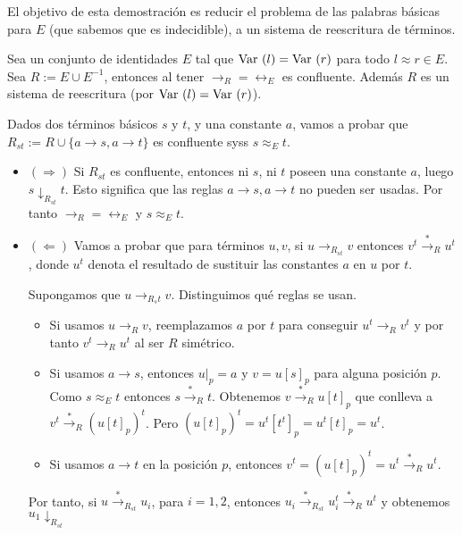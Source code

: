 \begin{demo}
  El objetivo de esta demostración es reducir el problema de las
  palabras básicas para $E$ (que sabemos que es indecidible), a un
  sistema de reescritura de términos.

  Sea un conjunto de identidades $E$ tal que $\mbox{Var }(l) = \mbox{Var }(r)$ para
  todo $l \approx r \in E$. Sea $R := E \cup E^{-1}$, entonces al
  tener $\rightarrow_R = \leftrightarrow_E$ es confluente. Además $R$
  es un sistema de reescritura (por $\mbox{Var }(l) = \mbox{Var }(r)$).

  Dados dos términos básicos $s$ y $t$, y una constante $a$, vamos a
  probar que $R_{st} := R \cup \{ a \rightarrow s, a \rightarrow t \}$
  es confluente syss $s \approx_E t$.

  \begin{itemize}
  \item $(\Rightarrow)$ Si $R_{st}$ es confluente, entonces ni $s$, ni
    $t$ poseen una constante $a$, luego $s \downarrow_{R_{st}} t$. Esto
    significa que las reglas $a \rightarrow s, a \rightarrow t$ no
    pueden ser usadas. Por tanto $\rightarrow_R = \leftrightarrow_E$ y
    $s \approx_E t$.

  \item $(\Leftarrow)$ Vamos a probar que para términos $u, v$, si
    $u \rightarrow_{R_{st}} v$ entonces $v^t \xrightarrow{*}_R u^t$,
    donde $u^t$ denota el resultado de sustituir las constantes $a$ en
    $u$ por $t$.

    Supongamos que $u \rightarrow_{R{_st}} v$. Distinguimos qué reglas
    se usan.
    \begin{itemize}
    \item Si usamos $u \rightarrow_R v$, reemplazamos $a$ por $t$ para
      conseguir $u^t \rightarrow_R v^t$ y por tanto
      $v^t \rightarrow_R u^t$ al ser $R$ simétrico.
    \item Si usamos $a \rightarrow s$, entonces $u|_p = a$ y
      $v = u[s]_p$ para alguna posición $p$. Como $s \approx_E t$
      entonces $s \xrightarrow{*}_R t$. Obtenemos
      $v \xrightarrow{*}_R u[t]_p$ que conlleva a
      $v^t \xrightarrow{*}_R (u[t]_p)^t$. Pero $(u[t]_p)^t =
      u^t[t^t]_p = u^t[t]_p = u^t$.
    \item Si usamos $a \rightarrow t$ en la posición $p$, entonces
      $v^t = (u[t]_p)^t = u^t \xrightarrow{*}_R u^t$.
    \end{itemize}
    Por tanto, si $u \xrightarrow{*}_{R_{st}} u_i$, para $i= 1,2$,
    entonces $u_i \xrightarrow{*}_{R_{st}} u_i^t \xrightarrow{*}_R u^t$
    y obtenemos $u_1 \downarrow_{R_{st}}$
  \end{itemize}
\end{demo}

